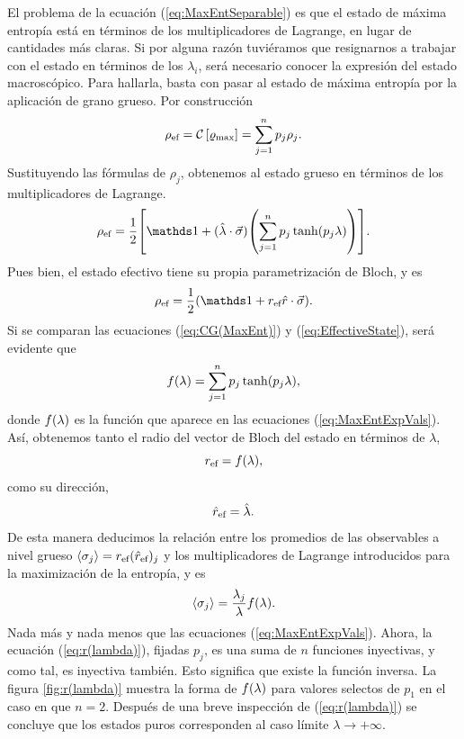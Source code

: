 El problema de la ecuación (\ref{eq:MaxEntSeparable}) es que el estado de máxima entropía está en términos de los multiplicadores de Lagrange, en lugar de cantidades más claras. Si por alguna razón tuviéramos que resignarnos a trabajar con el estado en términos de los $\lambda_{i}$, será necesario conocer la expresión del estado macroscópico. Para hallarla, basta con pasar al estado de máxima entropía por la aplicación de grano grueso. Por construcción 
\begin{equation}
    \rho_{\text{ef}}=\mathcal{C}\left[\varrho_{\max}\right]=\sum_{j=1}^{n}p_{j}\rho_{j}.\nonumber
\end{equation}
Sustituyendo las fórmulas de $\rho_{j}$, obtenemos al estado grueso en términos de los multiplicadores de Lagrange.
\begin{equation}\label{eq:CG(MaxEnt)}
    \rho_{\ef}=\frac{1}{2}\qty[\Id+(\paulivec{\lambda})\qty(\sum_{j=1}^{n}p_{j}\tanh(p_{j}\lambda))].
\end{equation}
Pues bien, el estado efectivo tiene su propia parametrización de Bloch, y es
\begin{equation}\label{eq:EffectiveState}
    \rho_{\ef}=\frac{1}{2}(\Id+r_{\ef}\paulivec{r}).
\end{equation}
Si se comparan las ecuaciones (\ref*{eq:CG(MaxEnt)}) y (\ref*{eq:EffectiveState}), será evidente que
\begin{equation}\label{eq:r(lambda)}
    f(\lambda)=\sum_{j=1}^{n}p_{j}\tanh(p_{j}\lambda),
\end{equation}
donde $f(\lambda)$ es la función que aparece en las ecuaciones (\ref{eq:MaxEntExpVals}). Así, obtenemos tanto el radio del vector de Bloch del estado en términos de $\lambda$,
\begin{equation}
    r_{\text{ef}}=f(\lambda),\nonumber
\end{equation}
como su dirección,
\begin{equation}
    \hat{r}_{\text{ef}}=\hat{\lambda}.\nonumber
\end{equation}
De esta manera deducimos la relación entre los promedios de las observables a nivel grueso $\expval{\sigma_{j}}=r_{\text{ef}}(\hat{r}_{\text{ef}})_{j}$ y los multiplicadores de Lagrange introducidos para la maximización de la entropía, y es
\begin{equation}
    \expval{\sigma_{j}}=\frac{\lambda_{j}}{\lambda}f(\lambda).
\end{equation}
Nada más y nada menos que las ecuaciones (\ref{eq:MaxEntExpVals}). Ahora, la ecuación (\ref{eq:r(lambda)}), fijadas $p_{j}$, es una suma de $n$ funciones inyectivas, y como tal, es inyectiva también. Esto significa que existe la función inversa. La figura \ref{fig:r(lambda)} muestra la forma de $f(\lambda)$ para valores selectos de $p_{1}$ en el caso en que $n=2$. Después de una breve inspección de (\ref{eq:r(lambda)}) se concluye que los estados puros corresponden al caso límite $\lambda\rightarrow+\infty$.

